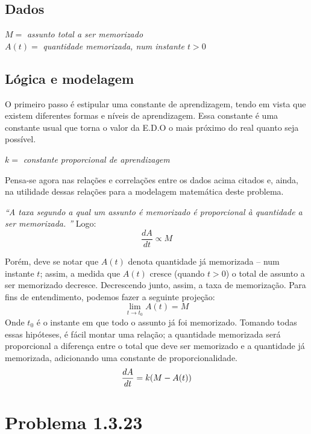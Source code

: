 \subsection{Dados}
\begin{center}
	\noindent $M= $\textit{ assunto total a ser memorizado\\}
	\noindent $A(t)=$\textit{ quantidade memorizada, num instante $t > 0$\\}
\end{center}
\subsection{Lógica e modelagem}
O primeiro passo é estipular uma constante de aprendizagem, tendo em vista que existem diferentes formas e níveis de aprendizagem. Essa constante é uma constante usual que torna o valor da E.D.O o mais próximo do real quanto seja possível.
\begin{center}
	\noindent $k= $\textit{ constante proporcional de aprendizagem\\}
\end{center}

Pensa-se agora nas relações e correlações entre os dados acima citados e, ainda, na utilidade dessas relações para a modelagem matemática deste problema.

\textit{“A taxa segundo a qual um assunto é memorizado é proporcional à quantidade a ser memorizada. ”}
Logo:
\begin{equation*}
\frac{dA}{dt} \propto M
\end{equation*}

Porém, deve se notar que $A(t)$ denota quantidade já memorizada – num instante $t$; assim, a medida que $A(t)$ cresce (quando $t>0$) o total de assunto a ser memorizado decresce. Decrescendo junto, assim, a taxa de memorização.
Para fins de entendimento, podemos fazer a seguinte projeção:
\[ \lim_{t \to t_{0}} A(t) = M \]
Onde $t_{0}$ é o instante em que todo o assunto já foi memorizado.
Tomando todas essas hipóteses, é fácil montar uma relação; a quantidade memorizada será proporcional a diferença entre o total que deve ser memorizado e a quantidade já memorizada, adicionando uma constante de proporcionalidade.
\begin{equation}\label{eqmemo}
\boldmath
	\frac{dA}{dt} = k(M-A(t))
\end{equation}

\section{Problema 1.3.23}
